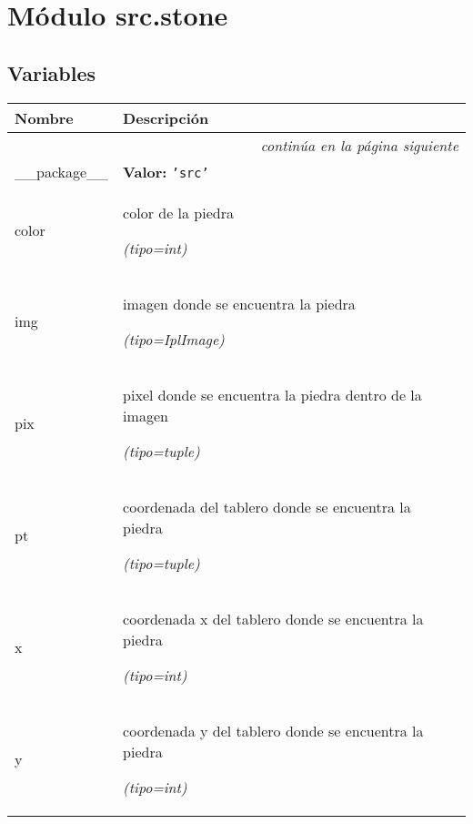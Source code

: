 %
%
%


\section{Módulo src.stone}

    \label{src:stone}


  \subsection{Variables}

    \vspace{-1cm}
\hspace{\varindent}\begin{longtable}{|p{\varnamewidth}|p{\vardescrwidth}|l}
\cline{1-2}
\cline{1-2} \centering \textbf{Nombre} & \centering \textbf{Descripción}& \\
\cline{1-2}
\endhead\cline{1-2}\multicolumn{3}{r}{\small\textit{continúa en la página siguiente}}\\\endfoot\cline{1-2}
\endlastfoot\raggedright \_\-\_\-p\-a\-c\-k\-a\-g\-e\-\_\-\_\- & \raggedright \textbf{Valor:} 
{\tt \texttt{'}\texttt{src}\texttt{'}}&\\
\cline{1-2}
\raggedright c\-o\-l\-o\-r\- & \raggedright color de la piedra

            {\it (tipo=int)}&\\
\cline{1-2}
\raggedright i\-m\-g\- & \raggedright imagen donde se encuentra la piedra

            {\it (tipo=IplImage)}&\\
\cline{1-2}
\raggedright p\-i\-x\- & \raggedright pixel donde se encuentra la piedra dentro de la imagen

            {\it (tipo=tuple)}&\\
\cline{1-2}
\raggedright p\-t\- & \raggedright coordenada del tablero donde se encuentra la piedra

            {\it (tipo=tuple)}&\\
\cline{1-2}
\raggedright x\- & \raggedright coordenada x del tablero donde se encuentra la piedra

            {\it (tipo=int)}&\\
\cline{1-2}
\raggedright y\- & \raggedright coordenada y del tablero donde se encuentra la piedra

            {\it (tipo=int)}&\\
\cline{1-2}
\end{longtable}


